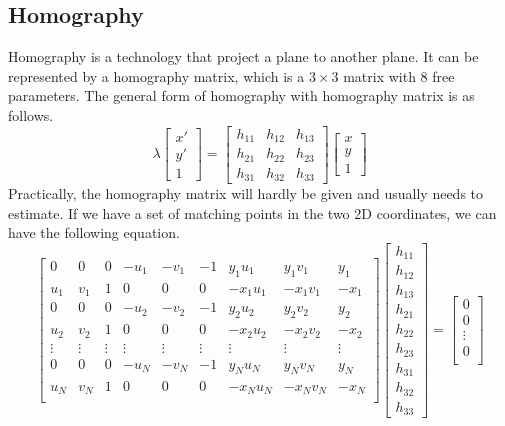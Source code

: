 \documentclass[paper=a4, fontsize=14pt]{scrartcl}
\numberwithin{equation}{section}		%
\numberwithin{figure}{section}			%
\numberwithin{table}{section}				%
\begin{document}
\subsection{Homography}
Homography\cite{berger2009geometry} is a technology that project a plane to another plane. It can be represented by a homography matrix, which is a $3\times 3$ matrix with 8 free parameters. The general form of homography with homography matrix is as follows.
$$\lambda\begin{bmatrix}x' \\ y' \\ 1\end{bmatrix}=
\begin{bmatrix}h_{11} & h_{12} & h_{13}\\
h_{21} & h_{22} & h_{23}\\
h_{31} & h_{32} & h_{33}\end{bmatrix} 
\begin{bmatrix}x \\ y \\ 1\end{bmatrix} $$
\indent Practically, the homography matrix will hardly be given and usually needs to estimate. If we have a set of matching points in the two 2D coordinates, we can have the following equation.
$$\begin{bmatrix}
0 & 0 & 0 & -u_1 & -v_1 & -1 & y_1u_1 & y_1v_1 & y_1\\
u_1 & v_1 & 1 & 0 & 0 & 0 & -x_1u_1 & -x_1v_1 & -x_1\\
0 & 0 & 0 & -u_2 & -v_2 & -1 & y_2u_2 & y_2v_2 & y_2\\
u_2 & v_2 & 1 & 0 & 0 & 0 & -x_2u_2 & -x_2v_2 & -x_2\\
\vdots & \vdots & \vdots & \vdots & \vdots & \vdots & \vdots & \vdots & \vdots\\
0 & 0 & 0 & -u_N & -v_N & -1 & y_Nu_N & y_Nv_N & y_N\\
u_N & v_N & 1 & 0 & 0 & 0 & -x_Nu_N & -x_Nv_N & -x_N\\
\end{bmatrix}
\begin{bmatrix}
h_{11} \\ h_{12} \\ h_{13} \\ 
h_{21} \\ h_{22} \\ h_{23} \\ 
h_{31} \\ h_{32} \\ h_{33} 
\end{bmatrix}
=\begin{bmatrix}
0 \\ 0 \\ \vdots \\ 0 \\
\end{bmatrix}$$
\end{document}
